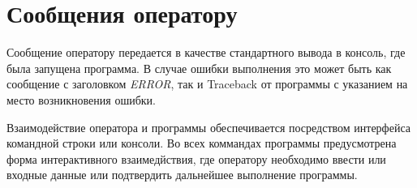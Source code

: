\newpage
\section{Сообщения оператору}

Сообщение оператору передается в качестве стандартного вывода в консоль, где была запущена программа. В случае ошибки выполнения это может быть как сообщение с заголовком \textit{ERROR}, так и Traceback от программы с указанием на место возникновения ошибки.

Взаимодействие оператора и программы обеспечивается посредством интерфейса командной строки или консоли.
Во всех коммандах программы предусмотрена форма интерактивного взаимедйствия, где оператору необходимо ввести или входные данные или подтвердить дальнейшее выполнение программы.
